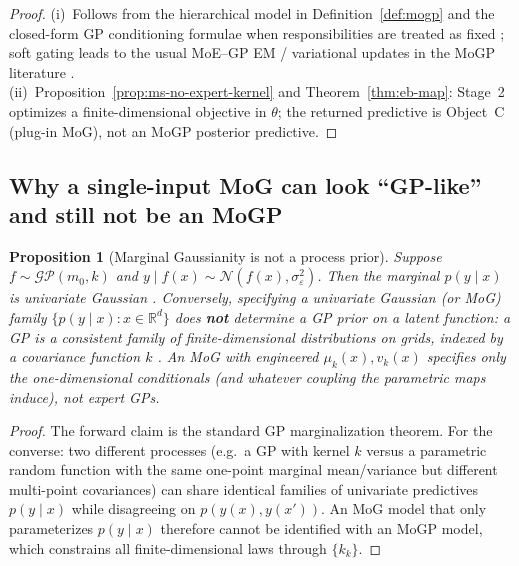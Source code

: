 \documentclass[11pt,a4paper]{article}
\theoremstyle{plain}
\newtheorem{proposition}[theorem]{Proposition}
\theoremstyle{definition}
\theoremstyle{remark}
\newcommand{\R}{\mathbb{R}}
\newcommand{\Ncal}{\mathcal{N}}
\newcommand{\GP}{\mathcal{GP}}
\newcommand{\tht}{\theta}
\begin{document}
\begin{proof}
(i)~Follows from the hierarchical model in Definition~\ref{def:mogp} and the closed-form
GP conditioning formulae when responsibilities are treated as fixed
\citep{RasmussenWilliams2006}; soft gating leads to the usual MoE--GP EM / variational
updates in the MoGP literature \citep{Tresp2001,YuanNeubauer2009}.\\
(ii)~Proposition~\ref{prop:ms-no-expert-kernel} and Theorem~\ref{thm:eb-map}: Stage~2
optimizes a finite-dimensional objective in \(\tht\); the returned predictive is
Object~C (plug-in MoG), not an MoGP posterior predictive.
\end{proof}

\subsection{Why a single-input MoG can look ``GP-like'' and still not be an MoGP}
\begin{proposition}[Marginal Gaussianity is not a process prior]
\label{prop:marginal-not-process}
Suppose \(f\sim\GP(m_0,k)\) and \(y\mid f(x)\sim\Ncal(f(x),\sigma_\varepsilon^2)\).
Then the marginal \(p(y\mid x)\) is univariate Gaussian
\citep{RasmussenWilliams2006}.
Conversely, specifying a univariate Gaussian (or MoG) family \(\{p(y\mid x):x\in\R^d\}\)
does \textbf{not} determine a GP prior on a latent function: a GP is a consistent
family of \emph{finite-dimensional distributions} on grids, indexed by a covariance
function \(k\) \citep{RasmussenWilliams2006}.
An MoG with engineered \(\mu_k(x),v_k(x)\) specifies only the one-dimensional
conditionals (and whatever coupling the parametric maps induce), not expert GPs.
\end{proposition}

\begin{proof}
The forward claim is the standard GP marginalization theorem.
For the converse: two different processes (e.g.\ a GP with kernel \(k\) versus a
parametric random function with the same one-point marginal mean/variance but
different multi-point covariances) can share identical families of univariate
predictives \(p(y\mid x)\) while disagreeing on \(p(y(x),y(x'))\).
An MoG model that only parameterizes \(p(y\mid x)\) therefore cannot be identified with
an MoGP model, which constrains all finite-dimensional laws through \(\{k_k\}\).
\end{proof}
\end{document}
